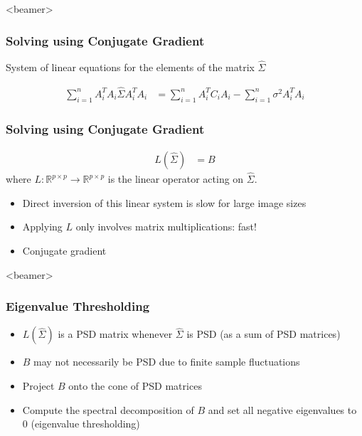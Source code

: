 \documentclass{beamer}
\begin{document}
\begin{frame}<beamer>
\frametitle{Solving using Conjugate Gradient}
System of linear equations for the elements of the matrix $\hat \Sigma$

\begin{equation*}
\begin{aligned}
\sum_{i=1}^n  A_i^T  A_i \hat \Sigma A_i^T A_i
&= \sum_{i=1}^n A_i^T C_i A_i - \sum_{i=1}^n \sigma^2 A_i^T A_i 
\end{aligned}
\label{eqn:normal_white}
\end{equation*}
\frametitle{Solving using Conjugate Gradient}
\begin{equation*}
\begin{aligned}
L(\hat\Sigma) 
&=  B 
\label{eqn:cg}
\end{aligned}
\end{equation*}
where $L:\mathbb{R}^{p\times p} \to \mathbb{R}^{p\times p}$ is the linear operator acting on $\hat{\Sigma}$.

\begin{itemize}
 \item Direct inversion of this linear system is slow for large image sizes
 \item Applying $L$ only involves matrix multiplications: fast!
 \item Conjugate gradient 
\end{itemize}

\end{frame}


\begin{frame}<beamer>
\frametitle{Eigenvalue Thresholding}
\begin{itemize}[]
 \item  $L(\hat{\Sigma})$ is a PSD matrix whenever $\hat{\Sigma}$ is PSD (as 
a sum of PSD matrices)
\item  $B$ may not necessarily be PSD due to finite 
sample fluctuations 
\item  Project $B$ onto the cone of PSD matrices
\item  Compute the spectral 
decomposition of $B$ and set all negative eigenvalues to 0  (eigenvalue thresholding)
\end{itemize}
\end{frame}
\end{document}
